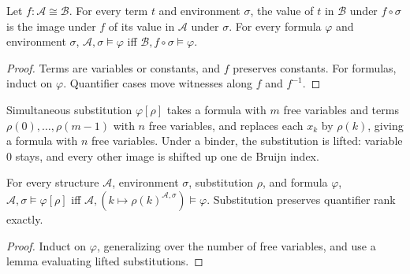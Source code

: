 \begin{theorem}
  \label{thm:desc-fo-iso-invariance}
  \leanok
  Let $f : \mathcal{A} \cong \mathcal{B}$. For every term $t$ and environment
  $\sigma$, the value of $t$ in $\mathcal{B}$ under $f \circ \sigma$ is the image
  under $f$ of its value in $\mathcal{A}$ under $\sigma$. For every formula
  $\varphi$ and environment $\sigma$, $\mathcal{A}, \sigma \models \varphi$ iff
  $\mathcal{B}, f \circ \sigma \models \varphi$.
\end{theorem}
\begin{proof}
  \leanok
  Terms are variables or constants, and $f$ preserves constants. For formulas,
  induct on $\varphi$. Quantifier cases move witnesses along $f$ and $f^{-1}$.
\end{proof}

\begin{definition}[Substitution]
  \label{def:desc-substitution}
  \leanok
  Simultaneous substitution $\varphi[\rho]$ takes a formula with $m$ free
  variables and terms $\rho(0), \dots, \rho(m-1)$ with $n$ free variables, and
  replaces each $x_k$ by $\rho(k)$, giving a formula with $n$ free variables.
  Under a binder, the substitution is lifted: variable $0$ stays, and every other
  image is shifted up one de Bruijn index.
\end{definition}

\begin{theorem}
  \label{thm:desc-substitution}
  \leanok
  For every structure $\mathcal{A}$, environment $\sigma$, substitution $\rho$,
  and formula $\varphi$,
  $\mathcal{A}, \sigma \models \varphi[\rho]$ iff
  $\mathcal{A}, (k \mapsto \rho(k)^{\mathcal{A},\sigma}) \models \varphi$.
  Substitution preserves quantifier rank exactly.
\end{theorem}
\begin{proof}
  \leanok
  Induct on $\varphi$, generalizing over the number of free variables, and use a
  lemma evaluating lifted substitutions.
\end{proof}

